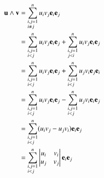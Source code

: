 \begin{align}
        \textbf{u}\wedge \textbf{v}
        &= 
        \sum_{\begin{subarray}{l}i,j=1\\i \neq j\end{subarray}}^n  
        u_iv_j\textbf{e}_i\textbf{e}_j 
        \label{eq:u_wedge_v}
        \\
        \label{eq:u_wedge_v_1}
        &= 
        \sum_{\begin{subarray}{l}i,j=1\\i < j\end{subarray}}^n u_iv_j\textbf{e}_i\textbf{e}_j 
        + 
        \sum_{\begin{subarray}{l}i,j=1\\j < i\end{subarray}}^n u_iv_j\textbf{e}_i\textbf{e}_j 
        \\
        \label{eq:u_wedge_v_2}
        &= 
        \sum_{\begin{subarray}{l}i,j=1\\i < j\end{subarray}}^n u_iv_j\textbf{e}_i\textbf{e}_j 
        + 
        \sum_{\begin{subarray}{l}i,j=1\\i < j\end{subarray}}^n u_jv_i\textbf{e}_j\textbf{e}_i
        \\
        \label{eq:u_wedge_v_3}
        &= 
        \sum_{\begin{subarray}{l}i,j=1\\i < j\end{subarray}}^n u_iv_j\textbf{e}_i\textbf{e}_j 
        - 
        \sum_{\begin{subarray}{l}i,j=1\\i < j\end{subarray}}^n u_jv_i\textbf{e}_i\textbf{e}_j
        \\
        \label{eq:u_wedge_v_4}
        &= 
        \sum_{\begin{subarray}{l}i,j=1\\i < j\end{subarray}}^n (u_iv_j -u_jv_i)\textbf{e}_i\textbf{e}_j
        \\
        \label{eq:u_wedge_v_5}
        &= 
        \sum_{\begin{subarray}{l}i,j=1\\i < j\end{subarray}}^n \begin{vmatrix} 
        u_i & v_i \\
        u_j & v_j
    \end{vmatrix}\textbf{e}_i\textbf{e}_j
\end{align}
